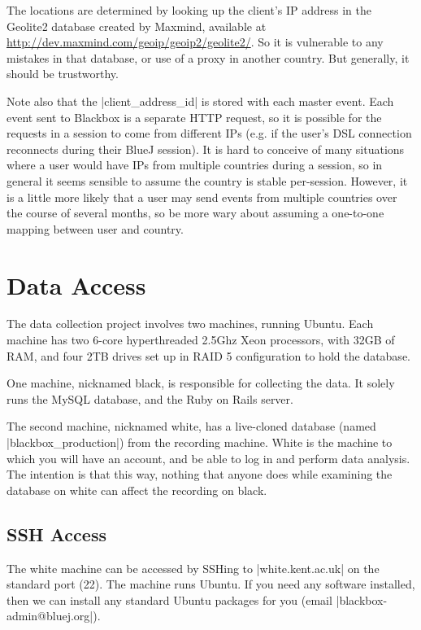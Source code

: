 \documentclass{report}
\begin{document}
The locations are determined by looking up the client's IP address in the Geolite2 database created by Maxmind,
available at \url{http://dev.maxmind.com/geoip/geoip2/geolite2/}.  So it is vulnerable to any mistakes
in that database, or use of a proxy in another country.  But generally, it should be trustworthy.

Note also that the |client_address_id| is stored with each master event.  Each event sent to Blackbox is
a separate HTTP request, so it is possible for the requests in a session to come from different IPs (e.g. if the user's DSL
connection reconnects during their BlueJ session).  It is hard to conceive of many situations where a user
would have IPs from multiple countries during a session, so in general it seems sensible to assume the country
is stable per-session.  However, it is a little more likely that a user may send events from multiple countries
over the course of several months, so be more wary about assuming a one-to-one mapping between user and country.

\chapter{Data Access}
\label{sec:data_access}

The data collection project involves two machines, running Ubuntu.  Each
machine has two 6-core hyperthreaded 2.5Ghz Xeon processors, with 32GB of RAM,
and four 2TB drives set up in RAID 5 configuration to hold the database.

One machine, nicknamed black, is
responsible for collecting the data.  It solely runs the MySQL database, and
the Ruby on Rails server.  

The second machine, nicknamed white, has a live-cloned database (named |blackbox_production|) from the recording
machine.  White is the machine to which you will have an account, and be able
to log in and perform data analysis.  The intention is that this way, nothing
that anyone does while examining the database on white can affect the
recording on black.

\section{SSH Access}

The white machine can be accessed by SSHing to |white.kent.ac.uk| on the
standard port (22).  The machine runs Ubuntu.  If you need any software
installed, then we can install any standard Ubuntu packages for you (email
|blackbox-admin@bluej.org|).
\end{document}
